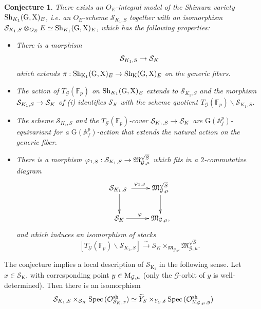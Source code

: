 \documentclass[reqno, 10pt]{amsart}
\makeatletter
\newcommand{\fkM}{\ensuremath{\mathfrak{M}}\xspace}
\newcommand{\BA}{\ensuremath{\mathbb {A}}\xspace}
\newcommand{\BF}{\ensuremath{\mathbb {F}}\xspace}
\newcommand{\CG}{\ensuremath{\mathcal {G}}\xspace}
\newcommand{\CO}{\ensuremath{\mathcal {O}}\xspace}
\newcommand{\CS}{\ensuremath{\mathcal {S}}\xspace}
\newcommand{\RG}{\ensuremath{\mathrm {G}}\xspace}
\newcommand{\RK}{\ensuremath{\mathrm {K}}\xspace}
\newcommand{\RX}{\ensuremath{\mathrm {X}}\xspace}
\DeclareMathOperator{\Spec}{Spec\,}
\newcommand{\wt}{\widetilde}
\newcommand{\bs}{\backslash}
\newtheorem {conjecture}[subsubsection]{Conjecture}
\theoremstyle{definition}
\numberwithin{equation}{subsection}
\numberwithin{subsubsection}{subsection}
\renewcommand{\to}{%
   \ifbool{@display}{\longrightarrow}{\rightarrow}%
   }
\newcommand{\Mloc}{{\rm M}}
\makeatother
\begin{document}
\begin{conjecture}\label{globconj-intro}
 There exists an $O_E$-integral model  of the Shimura variety 
 ${\rm Sh}_{K_1}(\RG, \RX)_E$, i.e. an $O_E$-scheme $\CS_{K_1, S}$ together with an isomorphism $\CS_{K_1, S}\otimes_{O_E}E\simeq {\rm Sh}_{K_1}(\RG, \RX)_E$,   which has the following properties:
 
 \begin{itemize}
\item[i)] There is a morphism \[\CS_{K_1, S}\to \mathcal \CS_{K}
\] which extends $\pi: {\rm Sh}_{\RK_1}(\RG, \RX)_E\to {\rm Sh}_{\RK}(\RG, \RX)_E$ on the generic fibers.
 
 \item[ii)] The action of $T_\CG(\BF_p)$ on ${\rm Sh}_{K_1 }(\RG, \RX)_E$ extends to $\CS_{K_1, S}$ and the morphism 
 $\CS_{K_1, S}\to \mathcal \CS_{K}$ of (i)
  identifies $\CS_{K}$ with the scheme quotient $T_\CG(\BF_p)\bs \CS_{K_1, S}$.
 
  \item[iii)] The scheme $\CS_{K_1, S}$ and the $T_\CG(\BF_p)$-cover $\CS_{K_1, S}\to \mathcal \CS_{K}$ are $\RG({\BA}_f^p)$-equivariant for a $\RG({\BA}_f^p)$-action that extends the natural action on the generic fiber.
  
  \item[iv)] There is a morphism $\varphi_{1, S}: \CS_{K_1, S}\to \fkM^{\sqrt{S}}_{\CG,\mu}$ which fits  in a $2$-commutative diagram
  \begin{equation*} 
\begin{aligned}
 \xymatrix{
     \CS_{K_1, S}\ \ar[r]^{\varphi_{1,S}} \ar[d]  &  \fkM^{\sqrt{S}}_{\CG,\mu} \ar[d] \\
       \CS_{K}\ar[r]^{\varphi}  & \fkM_{\CG,\mu},
        }
        \end{aligned}
\end{equation*}
 and which induces
   an isomorphism of stacks 
 \[
 [T_\CG(\BF_p)\bs \CS_{K_1, S}]\xrightarrow{\sim}  \CS_{K}\times_{\fkM_{\CG,\mu}}\fkM^{\sqrt{S}}_{\CG,\mu }.
 \]
 \end{itemize}
 \end{conjecture} 
The conjecture implies a local description of $\CS_{\RK_1}$ in the following sense. Let $x\in \CS_{\RK}$, with corresponding point $y\in \Mloc_{\CG,\mu}$ (only the $\CG$-orbit of $y$ is well-determined). Then there is an isomorphism
\begin{equation}\label{eq:sh2-intro}
 \CS_{K_1, S}\times_{\CS_{K}}\Spec(\CO^{\rm sh}_{\CS_{K}, x})\simeq  \wt Y_S\times_{Y_S,\delta}\Spec(\CO^{\rm sh}_{\Mloc_{\CG,\mu}, y})
 \end{equation}
\end{document}
